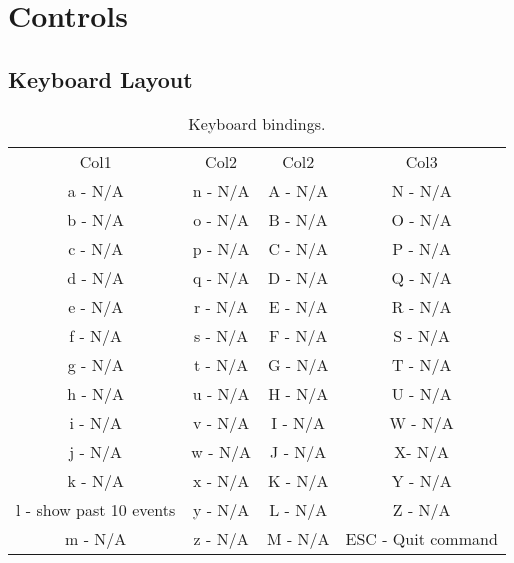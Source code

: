\documentclass{article}
\begin{document}
\section{Controls}
\subsection{Keyboard Layout}
\begin{table}[h!]
\centering
\begin{tabular}{|c| c| c |c|} 
\hline
 Col1 & Col2 & Col2 & Col3 \\ [0.5ex] 
 a - N/A & n - N/A & A - N/A & N - N/A \\ 
 b - N/A & o - N/A & B - N/A & O - N/A \\
 c - N/A & p - N/A & C - N/A & P - N/A  \\
 d - N/A & q - N/A & D - N/A & Q - N/A  \\
 e - N/A & r - N/A & E - N/A & R - N/A \\ 
 f - N/A & s - N/A & F - N/A & S - N/A \\
 g - N/A & t - N/A & G - N/A & T - N/A \\
 h - N/A & u - N/A & H - N/A & U - N/A \\
 i - N/A & v - N/A & I - N/A & W - N/A \\
 j - N/A & w - N/A & J - N/A & X- N/A \\
 k - N/A & x - N/A & K - N/A & Y - N/A \\
 l - show past 10 events & y - N/A & L - N/A & Z - N/A \\
 m - N/A & z - N/A & M - N/A & ESC - Quit command \\ [1ex] 
 \hline
\end{tabular}
\caption{Keyboard bindings.}
\label{table:1}
\end{table}
\end{document}
